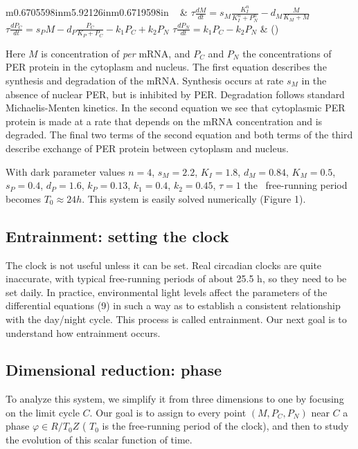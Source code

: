 \documentclass[letterpaper]{article}
\makeatletter
\newcommand\arraybslash{\let\\\@arraycr}
\newcounter{EquationNumber}
\renewcommand\theEquationNumber{\arabic{EquationNumber}}
\newcounter{Figure}
\makeatother
\begin{document}
\begin{flushleft}
\tablehead{}
\begin{supertabular}{m{0.6705598in}m{5.92126in}m{0.6719598in}}
~
 &
\centering  $\tau
\frac{\mathit{dM}}{\mathit{dt}}={s}_{M}\frac{{K}_{I}^{n}}{{K}_{I}^{n}+{P}_{N}^{n}}-{d}_{M}\frac{M}{{K}_{M}+M}$
$\tau
\frac{d{P}_{C}}{\mathit{dt}}={s}_{P}M-{d}_{P}\frac{{P}_{C}}{{K}_{P}+{P}_{C}}-{k}_{1}{P}_{C}+{k}_{2}{P}_{N}$
$\tau \frac{d{P}_{N}}{\mathit{dt}}={k}_{1}{P}_{C}-{k}_{2}{P}_{N}$ &
\raggedleft\arraybslash
(\label{bkm:Pfeutysystem}\stepcounter{EquationNumber}{\theEquationNumber})\\
\end{supertabular}
\end{flushleft}

\bigskip

Here  $M$ is concentration of \textit{per} mRNA, and  ${P}_{C}$ and 
${P}_{N}$ the concentrations of PER protein in the cytoplasm and
nucleus. The first equation describes the synthesis and degradation
of the mRNA. Synthesis occurs at rate  ${s}_{M}$ in the absence of
nuclear PER, but is inhibited by PER. Degradation follows standard
Michaelis-Menten kinetics. In the second equation we see that
cytoplasmic PER protein is made at a rate that depends on the mRNA
concentration and is degraded. The final two terms of the second
equation and both terms of the third describe exchange of PER protein
between cytoplasm and nucleus. 

With dark parameter values  $n=4$,  ${s}_{M}=2.2$,  ${K}_{I}=1.8$, 
${d}_{M}=0.84$,  ${K}_{M}=0.5$,  ${s}_{P}=0.4$,  ${d}_{P}=1.6$, 
${k}_{P}=0.13$,  ${k}_{1}=0.4$,  ${k}_{2}=0.45$,  $\tau =1$ the
\ free-running period becomes  ${T}_{0}{\approx}24h$. This system is
easily solved numerically (Figure 1). 

\subsection{Entrainment: setting the clock}
The clock is not useful unless it can be set. Real circadian clocks
are quite inaccurate, with typical free-running periods of about 25.5
h, so they need to be set daily. In practice, environmental light
levels affect the parameters of the differential equations (9) in
such a way as to establish a consistent relationship with the
day/night cycle. This process is called entrainment. Our next goal is
to understand how entrainment occurs. 

\subsection{Dimensional reduction: phase}
To analyze this system, we simplify it from three dimensions to one by
focusing on the limit cycle  $C$. Our goal is to assign to every
point  $(M,{P}_{C},{P}_{N})$ near  $C$ a phase  $\varphi
{\in}R/{T}_{0}Z$ ( ${T}_{0}$ is the free-running period of the
clock), and then to study the evolution of this scalar function of
time. 
\end{document}
